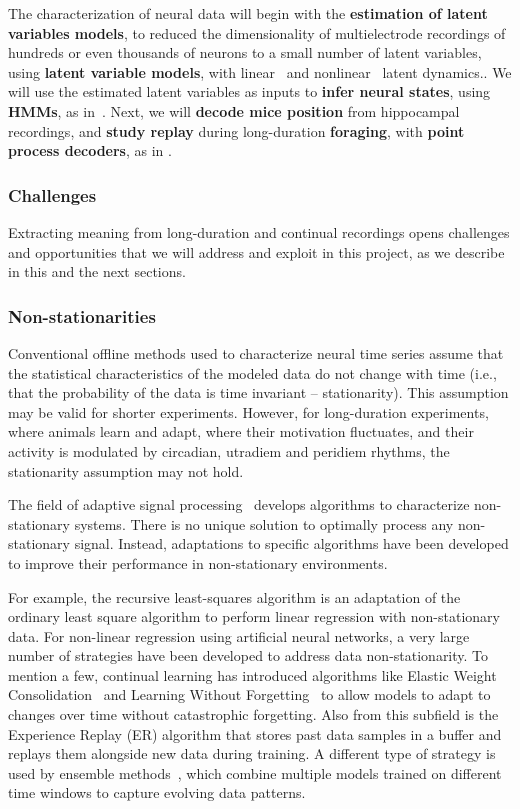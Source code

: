 \documentclass[12pt]{article}
\begin{document}
The characterization of neural data will begin with the \textbf{estimation of latent
variables models}, to reduced the dimensionality of multielectrode recordings of
hundreds or even thousands of neurons to a small number of latent variables,
using \textbf{latent variable models}, with linear~\citep{dunckerAndSahanai18}
and nonlinear~\citep{pandarinathEtAl} latent dynamics..
%
We will use the estimated latent variables as inputs to
\textbf{infer neural states}, using \textbf{HMMs}, as in~\citep{}.
%
Next, we will \textbf{decode mice position} from hippocampal recordings, and
\textbf{study
replay} during long-duration \textbf{foraging}, with \textbf{point process
decoders}, as in \citep{ppDecoder}.

\subsubsection{Challenges}

Extracting meaning from long-duration and continual recordings opens
challenges and opportunities that we will address and exploit in this project,
as we describe in this and the next sections.

\subsubsection*{Non-stationarities}

Conventional offline methods used to characterize neural time series assume
that the statistical characteristics of the modeled data do not change with
time (i.e., that the probability of the data is time invariant --
stationarity). This assumption may be valid for shorter experiments. However,
for long-duration experiments, where animals learn and adapt, where their
motivation fluctuates, and their activity is modulated by circadian, utradiem
and peridiem rhythms, the stationarity assumption may not hold.

The field of adaptive signal processing~\citep{haykin02} develops algorithms to
characterize non-stationary systems. There is no unique solution to optimally
process any non-stationary signal. Instead, adaptations to specific algorithms
have been developed to improve their performance in non-stationary
environments.

For example, the recursive least-squares algorithm \citep[][Chapter
9]{haykin02} is an adaptation of the ordinary least square algorithm to perform
linear regression with non-stationary data.
%
For non-linear regression using artificial neural networks, a very large number
of strategies have been developed to address data non-stationarity. To mention
a few, continual learning has introduced algorithms like  Elastic Weight
Consolidation~\citep[EWC][]{} and Learning Without Forgetting~\citep[LwF][]{}
to allow models to adapt to changes over time without catastrophic forgetting.
Also from this subfield is the Experience Replay (ER) algorithm that stores
past data samples in a buffer and replays them alongside new data during
training. A different type of strategy is used by ensemble methods~\citep{},
which combine multiple models trained on different time windows to capture
evolving data patterns.
\end{document}
